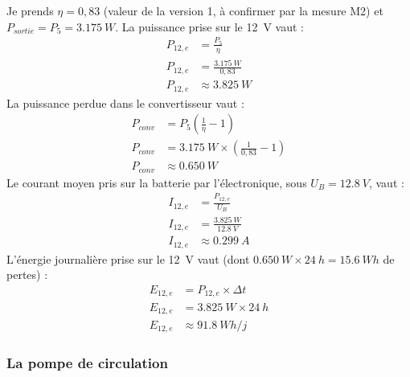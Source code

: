 \begin{demonstration}
Je prends $\eta = 0{,}83$ (valeur de la version 1, à confirmer par la mesure M2) et $P_{sortie} = P_5 = \qty{3,175}{W}$. La puissance prise sur le \qty{12}{V} vaut :
\begin{align*}
P_{12,e} &= \frac{P_5}{\eta}\\
P_{12,e} &= \frac{\qty{3,175}{W}}{0{,}83}\\
P_{12,e} &\approx \qty{3,825}{W}
\end{align*}
La puissance perdue dans le convertisseur vaut :
\begin{align*}
P_{conv} &= P_5\left(\frac{1}{\eta} - 1\right)\\
P_{conv} &= \qty{3,175}{W} \times \left(\frac{1}{0{,}83} - 1\right)\\
P_{conv} &\approx \qty{0,650}{W}
\end{align*}
Le courant moyen pris sur la batterie par l'électronique, sous $U_B = \qty{12,8}{V}$, vaut :
\begin{align*}
I_{12,e} &= \frac{P_{12,e}}{U_B}\\
I_{12,e} &= \frac{\qty{3,825}{W}}{\qty{12,8}{V}}\\
I_{12,e} &\approx \qty{0,299}{A}
\end{align*}
L'énergie journalière prise sur le \qty{12}{V} vaut (dont $\qty{0,650}{W} \times \qty{24}{h} = \qty{15,6}{Wh}$ de pertes) :
\begin{align*}
E_{12,e} &= P_{12,e} \times \Delta t\\
E_{12,e} &= \qty{3,825}{W} \times \qty{24}{h}\\
E_{12,e} &\approx \qty{91,8}{Wh/j}
\end{align*}
\end{demonstration}

\subsubsection*{La pompe de circulation}

